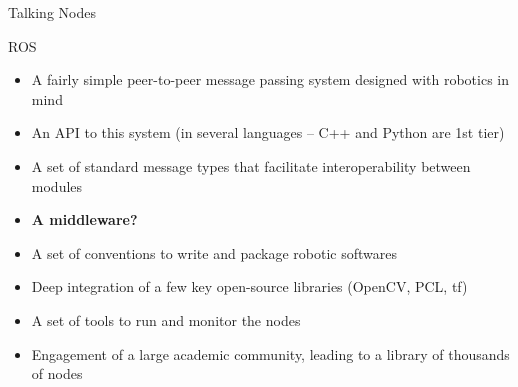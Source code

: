 \documentclass[compress]{beamer}
\begin{document}
\begin{frame}{Talking Nodes}
\begin{center}
\end{center}

\end{frame}


\begin{frame}{ROS}
    \begin{itemize}
        \item<1-> A fairly simple peer-to-peer message passing system designed with robotics in
            mind
        \item<2-> An API to this system (in several languages -- C++ and Python are
            1st tier)
        \item<3-> A set of standard message types that facilitate interoperability between modules
        \item<4> \bf{A middleware?}
        \item<5-> A set of conventions to write and package robotic softwares
        \item<6-> Deep integration of a few key open-source libraries (OpenCV, PCL, tf)
        \item<7-> A set of tools to run and monitor the nodes
        \item<8-> Engagement of a large academic community, leading to a library of thousands of nodes
    \end{itemize}
\end{frame}
\end{document}
